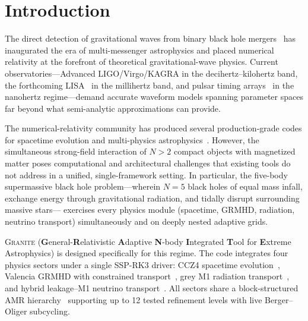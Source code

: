 \documentclass[aps,prd,twocolumn,superscriptaddress,nofootinbib,showpacs,
               longbibliography]{revtex4-2}
\newcommand{\granite}{\textsc{Granite}}
\begin{document}
\begin{abstract}
\granite{} is publicly available under the GPL-3.0 license at
\url{https://github.com/LiranOG/Granite}, archived at Zenodo with
DOI~\href{https://doi.org/10.5281/zenodo.19502265}{10.5281/zenodo.19502265}.
\end{abstract}


\maketitle

\section{Introduction}
\label{sec:intro}

The direct detection of gravitational waves from binary black hole
mergers~\cite{Abbott2016} has inaugurated the era of multi-messenger
astrophysics and placed numerical relativity at the forefront of
theoretical gravitational-wave physics.
Current observatories---Advanced LIGO/Virgo/KAGRA in the
decihertz--kilohertz band, the forthcoming LISA~\cite{AmaroSeoane2017} in
the millihertz band, and pulsar timing arrays~\cite{Agazie2023} in the
nanohertz regime---demand accurate waveform models spanning parameter spaces
far beyond what semi-analytic approximations can provide.

The numerical-relativity community has produced several
production-grade codes for spacetime evolution and multi-physics
astrophysics~\cite{Loffler2012,Porth2017,Stone2020}.
However, the simultaneous strong-field interaction of $N > 2$ compact
objects with magnetized matter poses computational and architectural
challenges that existing tools do not address in a unified,
single-framework setting.
In particular, the five-body supermassive black hole problem---wherein
$N = 5$ black holes of equal mass infall, exchange energy through
gravitational radiation, and tidally disrupt surrounding massive stars---
exercises every physics module (spacetime, GRMHD, radiation, neutrino
transport) simultaneously and on deeply nested adaptive grids.

\granite{} (\textbf{G}eneral-\textbf{R}elativistic \textbf{A}daptive
\textbf{N}-body \textbf{I}ntegrated \textbf{T}ool for \textbf{E}xtreme
Astrophysics) is designed specifically for this regime.
The code integrates four physics sectors under a single SSP-RK3 driver:
CCZ4 spacetime evolution~\cite{Alic2012}, Valencia GRMHD with constrained
transport~\cite{Banyuls1997}, grey M1 radiation
transport~\cite{Minerbo1978,Foucart2015}, and hybrid leakage--M1 neutrino
transport~\cite{Ruffert1996,Perego2016}.
All sectors share a block-structured AMR hierarchy~\cite{BergerOliger1984}
supporting up to 12 tested refinement levels with live Berger--Oliger
subcycling.
\end{document}
